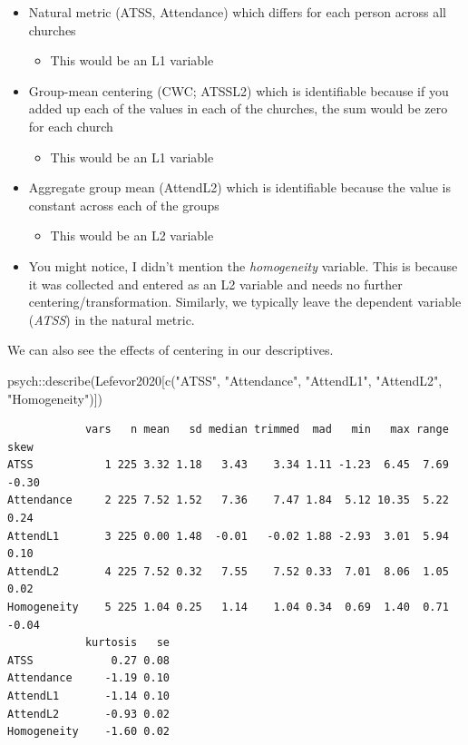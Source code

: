 \documentclass[
  english,
]{book}
\newenvironment{Shaded}{\begin{snugshade}}{\end{snugshade}}
\newcommand{\FunctionTok}[1]{\textcolor[rgb]{0.00,0.00,0.00}{#1}}
\newcommand{\NormalTok}[1]{#1}
\newcommand{\SpecialCharTok}[1]{\textcolor[rgb]{0.00,0.00,0.00}{#1}}
\newcommand{\StringTok}[1]{\textcolor[rgb]{0.31,0.60,0.02}{#1}}
\providecommand{\tightlist}{%
  \setlength{\itemsep}{0pt}\setlength{\parskip}{0pt}}
\begin{document}
\begin{itemize}
\tightlist
\item
  Natural metric (ATSS, Attendance) which differs for each person across all churches

  \begin{itemize}
  \tightlist
  \item
    This would be an L1 variable
  \end{itemize}
\item
  Group-mean centering (CWC; ATSSL2) which is identifiable because if you added up each of the values in each of the churches, the sum would be zero for each church

  \begin{itemize}
  \tightlist
  \item
    This would be an L1 variable
  \end{itemize}
\item
  Aggregate group mean (AttendL2) which is identifiable because the value is constant across each of the groups

  \begin{itemize}
  \tightlist
  \item
    This would be an L2 variable
  \end{itemize}
\item
  You might notice, I didn't mention the \emph{homogeneity} variable. This is because it was collected and entered as an L2 variable and needs no further centering/transformation. Similarly, we typically leave the dependent variable (\emph{ATSS}) in the natural metric.
\end{itemize}

We can also see the effects of centering in our descriptives.

\begin{Shaded}
\begin{Highlighting}[]
\NormalTok{psych}\SpecialCharTok{::}\FunctionTok{describe}\NormalTok{(Lefevor2020[}\FunctionTok{c}\NormalTok{(}\StringTok{"ATSS"}\NormalTok{, }\StringTok{"Attendance"}\NormalTok{, }\StringTok{"AttendL1"}\NormalTok{, }\StringTok{"AttendL2"}\NormalTok{, }\StringTok{"Homogeneity"}\NormalTok{)])}
\end{Highlighting}
\end{Shaded}

\begin{verbatim}
            vars   n mean   sd median trimmed  mad   min   max range  skew
ATSS           1 225 3.32 1.18   3.43    3.34 1.11 -1.23  6.45  7.69 -0.30
Attendance     2 225 7.52 1.52   7.36    7.47 1.84  5.12 10.35  5.22  0.24
AttendL1       3 225 0.00 1.48  -0.01   -0.02 1.88 -2.93  3.01  5.94  0.10
AttendL2       4 225 7.52 0.32   7.55    7.52 0.33  7.01  8.06  1.05  0.02
Homogeneity    5 225 1.04 0.25   1.14    1.04 0.34  0.69  1.40  0.71 -0.04
            kurtosis   se
ATSS            0.27 0.08
Attendance     -1.19 0.10
AttendL1       -1.14 0.10
AttendL2       -0.93 0.02
Homogeneity    -1.60 0.02
\end{verbatim}
\end{document}
